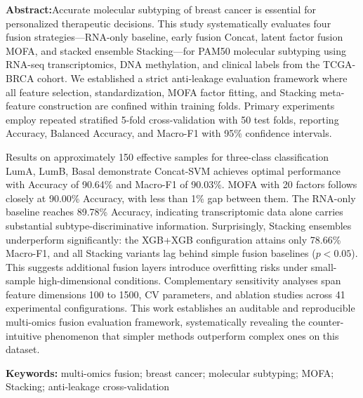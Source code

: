 \documentclass[UTF8,12pt,a4paper]{article}
\begin{document}
\newpage

\textbf{Abstract:}Accurate molecular subtyping of breast cancer is essential for personalized therapeutic decisions. This study systematically evaluates four fusion strategies—RNA-only baseline, early fusion Concat, latent factor fusion MOFA, and stacked ensemble Stacking—for PAM50 molecular subtyping using RNA-seq transcriptomics, DNA methylation, and clinical labels from the TCGA-BRCA cohort. We established a strict anti-leakage evaluation framework where all feature selection, standardization, MOFA factor fitting, and Stacking meta-feature construction are confined within training folds. Primary experiments employ repeated stratified 5-fold cross-validation with 50 test folds, reporting Accuracy, Balanced Accuracy, and Macro-F1 with 95\% confidence intervals.

Results on approximately 150 effective samples for three-class classification LumA, LumB, Basal demonstrate Concat-SVM achieves optimal performance with Accuracy of 90.64\% and Macro-F1 of 90.03\%. MOFA with 20 factors follows closely at 90.00\% Accuracy, with less than 1\% gap between them. The RNA-only baseline reaches 89.78\% Accuracy, indicating transcriptomic data alone carries substantial subtype-discriminative information. Surprisingly, Stacking ensembles underperform significantly: the XGB+XGB configuration attains only 78.66\% Macro-F1, and all Stacking variants lag behind simple fusion baselines ($p<0.05$). This suggests additional fusion layers introduce overfitting risks under small-sample high-dimensional conditions. Complementary sensitivity analyses span feature dimensions 100 to 1500, CV parameters, and ablation studies across 41 experimental configurations. This work establishes an auditable and reproducible multi-omics fusion evaluation framework, systematically revealing the counter-intuitive phenomenon that simpler methods outperform complex ones on this dataset.

\vspace{0.5em}
\noindent\textbf{Keywords:} multi-omics fusion; breast cancer; molecular subtyping; MOFA; Stacking; anti-leakage cross-validation

\newpage

\tableofcontents
\newpage











\end{document}
